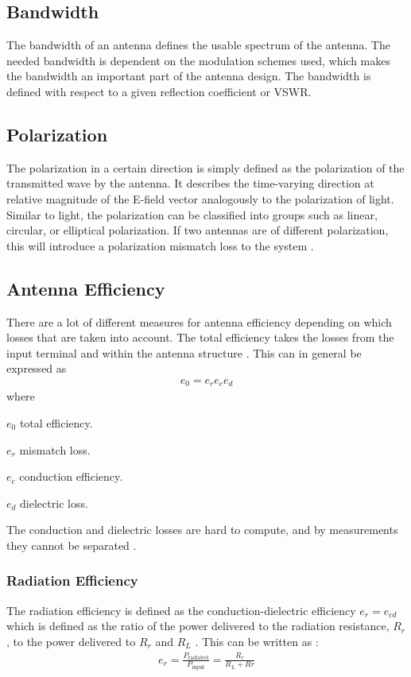 \subsection{Bandwidth}
The bandwidth of an antenna defines the usable spectrum of the antenna. The needed bandwidth is dependent on the modulation schemes used, which makes the bandwidth an important part of the antenna design. The bandwidth is defined with respect to a given reflection coefficient or VSWR.

\subsection{Polarization}
The polarization in a certain direction is simply defined as the polarization of the transmitted wave by the antenna. It describes the time-varying direction at relative magnitude of the E-field vector analogously to the polarization of light. Similar to light, the polarization can be classified into groups such as linear, circular, or elliptical polarization. If two antennas are of different polarization, this will introduce a polarization mismatch loss to the system \cite{balanis2012antenna}.

\subsection{Antenna Efficiency}
There are a lot of different measures for antenna efficiency depending on which losses that are taken into account. The total efficiency takes the losses from the input terminal and within the antenna structure \cite{balanis2012antenna}. This can in general be expressed as \cite{balanis2012antenna}
\begin{align}
\label{eq:ant-eff}
  e_0 = e_r e_c e_d 
\end{align}
where
\begin{where}
\item[$e_0$] total efficiency.
\item[$e_r$] mismatch loss.
\item[$e_c$] conduction efficiency.
\item[$e_d$] dielectric loss.
\end{where}
The conduction and dielectric losses are hard to compute, and by measurements they cannot be separated \cite{balanis2012antenna}.

\subsubsection{Radiation Efficiency}
The radiation efficiency is defined as the conduction-dielectric efficiency $e_r = e_{cd}$ which is defined as the ratio of the power delivered to the radiation resistance, $R_r$, to the power delivered to $R_r$ and $R_L$ \cite{balanis2012antenna}. This can be written as \cite{balanis2012antenna}:
\begin{align}
  e_r = \frac{P_{\text{radiated}}}{P_{\text{input}}} = \frac{R_r}{R_L+Rr}
\end{align}

